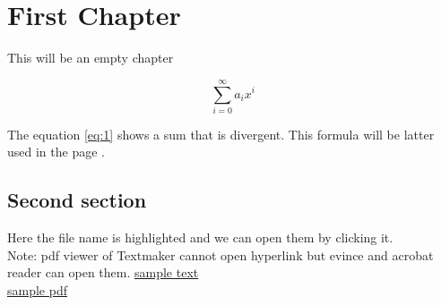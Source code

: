 \documentclass{book}
\begin{document}
\frontmatter
\tableofcontents
\clearpage

\chapter{First Chapter}

This will be an empty chapter

\begin{equation}
\label{eq:1}
\sum_{i=0}^{\infty} a_i x^i
\end{equation}

The equation \ref{eq:1} shows a sum that is divergent. This formula will be latter used in the page \pageref{second}.

\clearpage

\section{Second section} \label{second}

Here the file name is highlighted and we can open them by clicking it.\\
Note: pdf viewer of Textmaker cannot open hyperlink but evince and acrobat reader can open them.
\href{run:./sample.txt}{sample text}\\
\href{run:sample.pdf}{sample pdf}\\
\end{document}
